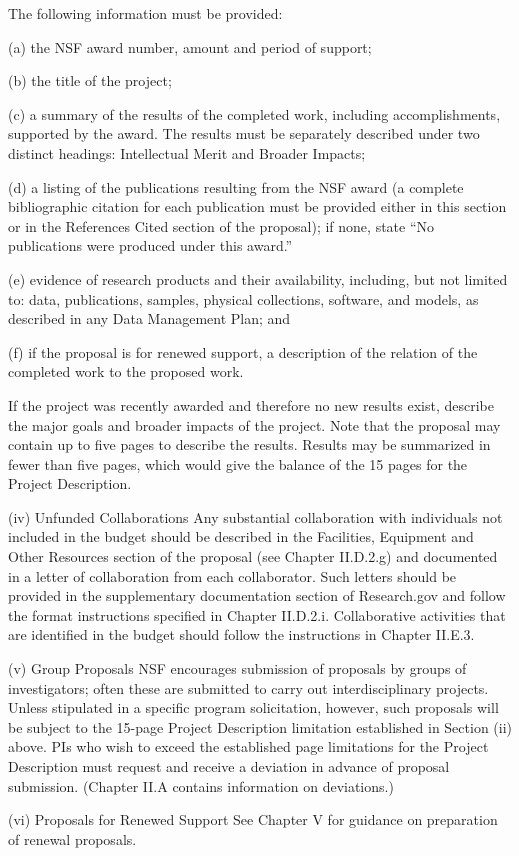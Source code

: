 {The following information must be provided:

(a) the NSF award number, amount and period of support;

(b) the title of the project;

(c) a summary of the results of the completed work, including accomplishments, 
supported by the award. The results must be separately described under two 
distinct headings: Intellectual Merit and Broader Impacts;

(d) a listing of the publications resulting from the NSF award (a complete 
bibliographic citation for each publication must be provided either in this 
section or in the References Cited section of the proposal); if none, state 
“No publications were produced under this award.”

(e) evidence of research products and their availability, including, but not 
limited to: data, publications, samples, physical collections, software, and 
models, as described in any Data Management Plan; and

(f) if the proposal is for renewed support, a description of the relation of 
the completed work to the proposed work.

If the project was recently awarded and therefore no new results exist, 
describe the major goals and broader impacts of the project. Note that the 
proposal may contain up to five pages to describe the results. Results may be 
summarized in fewer than five pages, which would give the balance of the 15 
pages for the Project Description.

(iv) Unfunded Collaborations
Any substantial collaboration with individuals not included in the budget 
should be described in the Facilities, Equipment and Other Resources section of 
the proposal (see Chapter II.D.2.g) and documented in a letter of collaboration 
from each collaborator. Such letters should be provided in the supplementary 
documentation section of Research.gov and follow the format instructions 
specified in Chapter II.D.2.i. Collaborative activities that are identified in 
the budget should follow the instructions in Chapter II.E.3.

(v) Group Proposals
NSF encourages submission of proposals by groups of investigators; often these 
are submitted to carry out interdisciplinary projects. Unless stipulated in a 
specific program solicitation, however, such proposals will be subject to the 
15-page Project Description limitation established in Section (ii) above. PIs 
who wish to exceed the established page limitations for the Project Description 
must request and receive a deviation in advance of proposal submission. 
(Chapter II.A contains information on deviations.)

(vi) Proposals for Renewed Support
See Chapter V for guidance on preparation of renewal proposals.


}
